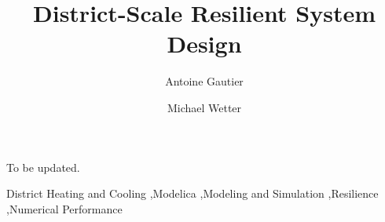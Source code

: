 \begin{frontmatter}



\title{District-Scale Resilient System Design}

%
\author[lbl]{Antoine Gautier}%
\author[lbl]{Michael Wetter}%
%
            

\begin{abstract}

\end{abstract}

\begin{highlights}

\item To be updated.
 
\end{highlights}

\begin{keyword}
District Heating and Cooling \sep Modelica \sep Modeling and Simulation \sep Resilience \sep Numerical Performance
\end{keyword}

\end{frontmatter}